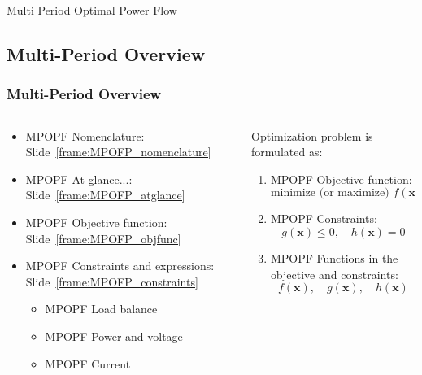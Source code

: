 \documentclass[
	11pt, %
	aspectratio=169, %
]{beamer}
\begin{document}
\begin{frame}
    \centering
    \LARGE
    Multi Period Optimal Power Flow
\end{frame}


\subsection{Multi-Period Overview}

\begin{frame}
	\frametitle{Multi-Period Overview}
	
	\begin{columns}
		\begin{column}{0.5\textwidth}
			\begin{itemize}
				\item MPOPF Nomenclature: Slide~\ref{frame:MPOFP_nomenclature}
				\item MPOPF At glance...: Slide~\ref{frame:MPOFP_atglance}
				\item MPOPF Objective function: Slide~\ref{frame:MPOFP_objfunc}
				\item MPOPF Constraints and expressions: Slide~\ref{frame:MPOFP_constraints}
					\begin{itemize}
						\item MPOPF Load balance
						\item MPOPF Power and voltage
						\item MPOPF Current
					\end{itemize}
			\end{itemize}
		\end{column}

		\begin{column}{0.5\textwidth}
			Optimization problem is formulated as:
			\begin{enumerate}
				\item MPOPF Objective function:
				\[
					\text{minimize (or maximize) } f(\mathbf{x})
				\]
				\item MPOPF Constraints:
				\[
					g(\mathbf{x}) \leq 0, \quad h(\mathbf{x}) = 0
				\]
				\item MPOPF Functions in the objective and constraints:
				\[
					f(\mathbf{x}), \quad g(\mathbf{x}), \quad h(\mathbf{x})
				\]
			\end{enumerate}
		\end{column}
	\end{columns}
\end{frame}
\end{document}
